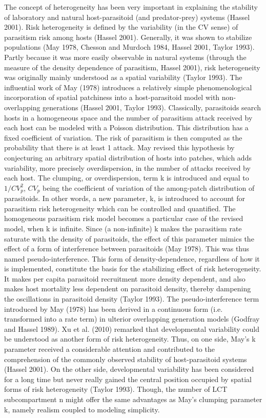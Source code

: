 \documentclass[12pt,a4paper,onecolumn]{article}
\begin{document}
\tabto{1 cm} The concept of heterogeneity has been very important in explaining the stability of laboratory and natural host-parasitoid (and predator-prey) systems (Hassel 2001). Risk heterogeneity is defined by the variability (in the CV sense) of parasitism risk among hosts (Hassel 2001). Generally, it was shown to stabilize populations (May 1978, Chesson and Murdoch 1984, Hassel 2001, Taylor 1993). Partly because it was more easily observable in natural systems (through the measure of the density dependence of parasitism, Hassel 2001), risk heterogeneity was originally mainly understood as a spatial variability (Taylor 1993). The influential work of May (1978) introduces a relatively simple phenomenological incorporation of spatial patchiness into a host-parasitoid model with non-overlapping generations (Hassel 2001, Taylor 1993). Classically, parasitoids search hosts in a homogeneous space and the number of parasitism attack received by each host can be modeled with a Poisson distribution. This distribution has a fixed coefficient of variation. The risk of parasitism is then computed as the probability that there is at least 1 attack. May revised this hypothesis by conjecturing an arbitrary spatial distribution of hosts into patches, which adds variability, more precisely overdispersion, in the number of attacks received by each host. The clumping, or overdispersion, term k is introduced and equal to $1/CV_p^2$, $CV_p$ being the coefficient of variation of the among-patch distribution of parasitoids. In other words, a new parameter, k, is introduced to account for parasitism risk heterogeneity which can be controlled and quantified. The homogeneous parasitism risk model becomes a particular case of the revised model, when k is infinite. 
\tabto{1 cm}  Since (a non-infinite) k makes the parasitism rate saturate with the density of parasitoids, the effect of this parameter mimics the effect of a form of interference between parasitoids (May 1978). This was thus named pseudo-interference. This form of density-dependence, regardless of how it is implemented, constitute the basis for the stabilizing effect of risk heterogeneity. It makes per capita parasitoid recruitment more density dependent, and also makes host mortality less dependent on parasitoid density, thereby dampening the oscillations in parasitoid density (Taylor 1993). The pseudo-interference term introduced by May (1978) has been derived in a continuous form (i.e. transformed into a rate term) in ulterior overlapping generation models (Godfray and Hassel 1989). Xu et al. (2010) remarked that developmental variability could be understood as another form of risk heterogeneity. Thus, on one side, May's k parameter received a considerable attention and contributed to the comprehension of the commonly observed stability of host-parasitoid systems (Hassel 2001). On the other side, developmental variability has been considered for a long time but never really gained the central position occupied by spatial forms of risk heterogeneity (Taylor 1993). Though, the number of LCT subcompartment n might offer the same advantages as May's clumping parameter k, namely realism coupled to modeling simplicity. \\ 
\end{document}
